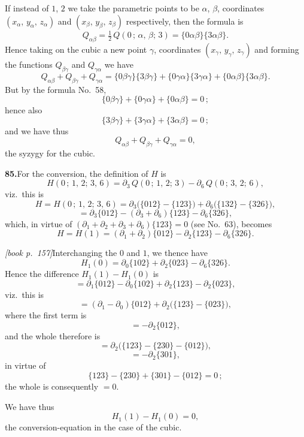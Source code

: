 \documentclass[11pt,a4paper]{article}
\providecommand{\altf}[1]{\{#1\}}
\begin{document}
If instead of $1$, $2$ we take the parametric points to be $\alpha$, $\beta$, coordinates $(x_\alpha,\,y_\alpha,\,z_\alpha)$ and $(x_\beta,\,y_\beta,\,z_\beta)$ respectively, then the formula is
\[
Q_{\alpha\beta} = \tfrac{1}{2}\,Q(0\,;\,\alpha,\,\beta;\,3) = \altf{0\alpha\beta}\altf{3\alpha\beta}.
\]
Hence taking on the cubic a new point $\gamma$, coordinates $(x_\gamma,\,y_\gamma,\,z_\gamma)$ and forming the functions $Q_{\beta\gamma}$ and $Q_{\gamma\alpha}$ we have
\[
Q_{\alpha\beta} + Q_{\beta\gamma} + Q_{\gamma\alpha} = \altf{0\beta\gamma}\altf{3\beta\gamma} + \altf{0\gamma\alpha}\altf{3\gamma\alpha} + \altf{0\alpha\beta}\altf{3\alpha\beta}.
\]
But by the formula No.\ 58,
\[
\altf{0\beta\gamma} + \altf{0\gamma\alpha} + \altf{0\alpha\beta} = 0\,;
\]
hence also
\[
\altf{3\beta\gamma} + \altf{3\gamma\alpha} + \altf{3\alpha\beta} = 0\,;
\]
and we have thus
\[
Q_{\alpha\beta} + Q_{\beta\gamma} + Q_{\gamma\alpha} = 0,
\]
the syzygy for the cubic.

\medskip\noindent\textbf{85.}\quad For the conversion, the definition of $H$ is
\[
H(0\,;\,1,\,2;\,3,\,6) = \partial_3\,Q(0\,;\,1,\,2;\,3) - \partial_6\,Q(0\,;\,3,\,2;\,6),
\]
viz.\ this is
\[
H = H(0\,;\,1,\,2;\,3,\,6) = \partial_3\bigl(\altf{012} - \altf{123}\bigr) + \partial_6\bigl(\altf{132} - \altf{326}\bigr),
\]
\[
= \partial_3\altf{012} - (\partial_3 + \partial_6)\altf{123} - \partial_6\altf{326},
\]
which, in virtue of $(\partial_1 + \partial_2 + \partial_3 + \partial_6)\altf{123} = 0$ (see No.\ 63), becomes
\[
H = H(1) = (\partial_1 + \partial_2)\altf{012} - \partial_2\altf{123} - \partial_6\altf{326}.
\]

\medskip\noindent\textit{[book p.~157]}\quad Interchanging the $0$ and $1$, we thence have
\[
H_1(0) = \partial_0\altf{102} + \partial_2\altf{023} - \partial_6\altf{326}.
\]
Hence the difference $H_1(1) - H_1(0)$ is
\[
= \partial_1\altf{012} - \partial_0\altf{102} + \partial_2\altf{123} - \partial_2\altf{023},
\]
viz.\ this is
\[
= (\partial_1 - \partial_0)\altf{012} + \partial_2\bigl(\altf{123} - \altf{023}\bigr),
\]
where the first term is
\[
= -\partial_2\altf{012},
\]
and the whole therefore is
\[
= \partial_2\bigl(\altf{123} - \altf{230} - \altf{012}\bigr),
\]
\[
= -\partial_2\altf{301},
\]
in virtue of
\[
\altf{123} - \altf{230} + \altf{301} - \altf{012} = 0\,;
\]
the whole is consequently $= 0$.

We have thus
\[
H_1(1) - H_1(0) = 0,
\]
the conversion-equation in the case of the cubic.
\end{document}

